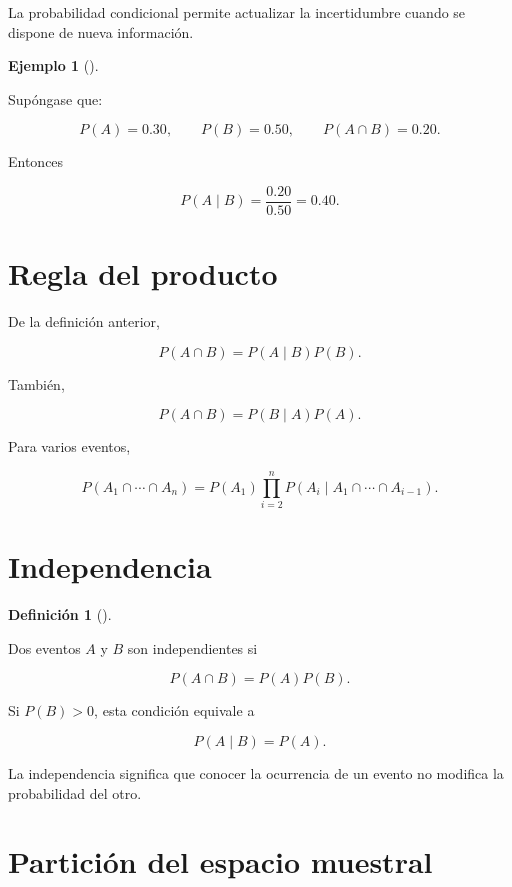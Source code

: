 \documentclass[
  spanish,
  11pt,
  letterpaper,
  DIV=11,
  numbers=noendperiod]{scrreprt}
\theoremstyle{definition}
\newtheorem{definition}{Definición}[chapter]
\theoremstyle{plain}
\theoremstyle{definition}
\newtheorem{example}{Ejemplo}[chapter]
\theoremstyle{remark}
\begin{document}
La probabilidad condicional permite actualizar la incertidumbre cuando
se dispone de nueva información.

\begin{example}[]\protect\hypertarget{exm-probabilidad-condicional}{}\label{exm-probabilidad-condicional}

Supóngase que:

\[
P(A)=0.30,
\qquad
P(B)=0.50,
\qquad
P(A\cap B)=0.20.
\]

Entonces

\[
P(A\mid B)
=
\frac{0.20}{0.50}
=
0.40.
\]

\end{example}

\section{Regla del producto}\label{regla-del-producto}

De la definición anterior,

\[
P(A\cap B)
=
P(A\mid B)P(B).
\]

También,

\[
P(A\cap B)
=
P(B\mid A)P(A).
\]

Para varios eventos,

\[
P(A_1\cap\cdots\cap A_n)
=
P(A_1)
\prod_{i=2}^{n}
P(A_i\mid A_1\cap\cdots\cap A_{i-1}).
\]

\section{Independencia}\label{independencia}

\begin{definition}[]\protect\hypertarget{def-independencia-eventos}{}\label{def-independencia-eventos}

Dos eventos \(A\) y \(B\) son independientes si

\[
P(A\cap B)
=
P(A)P(B).
\]

\end{definition}

Si \(P(B)>0\), esta condición equivale a

\[
P(A\mid B)=P(A).
\]

La independencia significa que conocer la ocurrencia de un evento no
modifica la probabilidad del otro.

\section{Partición del espacio
muestral}\label{particiuxf3n-del-espacio-muestral}
\end{document}
